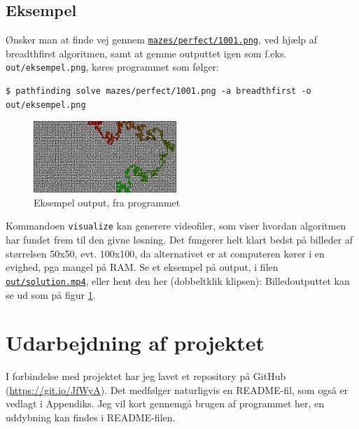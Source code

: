 \documentclass[a4paper, 12pt]{article}
\begin{document}
\subsection{Eksempel}
Ønsker man at finde vej gennem \texttt{\href{https://github.com/Tinggaard/pathfinding/blob/master/mazes/perfect/1001.png}{mazes/perfect/1001.png}}, ved hjælp af breadthfirst algoritmen, samt at gemme outputtet igen som f.eks. \texttt{out/eksempel.png}, køres programmet som følger:
\begin{verbatim}
$ pathfinding solve mazes/perfect/1001.png -a breadthfirst -o out/eksempel.png
\end{verbatim}
\begin{figure}
    \centering
    \vspace{-20pt}
    \includegraphics[width=0.48\textwidth]{img/output.png}
    \caption{Eksempel output, fra programmet}
    \label{fig:output}
    \vspace{-20pt}
\end{figure}
Kommandoen \texttt{visualize} kan generere videofiler, som viser hvordan algoritmen har fundet frem til den givne løsning. Det fungerer helt klart bedst på billeder af størrelsen 50x50, evt. 100x100, da alternativet er at computeren kører i en evighed, pga mangel på RAM. Se et eksempel på output, i filen \texttt{\href{https://github.com/Tinggaard/pathfinding/raw/master/out/solution.mp4}{out/solution.mp4}}, eller hent den her (dobbeltklik klipsen):
Billedoutputtet kan se ud som på figur \ref{fig:output}.


\newpage
\section{Udarbejdning af projektet}
I forbindelse med projektet har jeg lavet et repository på GitHub (\url{https://git.io/JfWyA}). Det medfølger naturligvis en README-fil, som også er vedlagt i Appendiks. Jeg vil kort gennemgå brugen af programmet her, en uddybning kan findes i README-filen.
\end{document}
